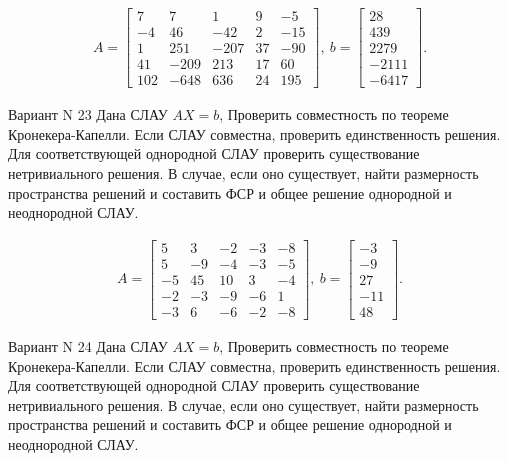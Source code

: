 \documentclass[11pt]{report}
\begin{document}
\begin{align*}
 A = \left[\begin{matrix}7 & 7 & 1 & 9 & -5\\-4 & 46 & -42 & 2 & -15\\1 & 251 & -207 & 37 & -90\\41 & -209 & 213 & 17 & 60\\102 & -648 & 636 & 24 & 195\end{matrix}\right],
\ b = \left[\begin{matrix}28\\439\\2279\\-2111\\-6417\end{matrix}\right]. 
 \end{align*}

Вариант N 23
Дана СЛАУ $AX = b$,
Проверить совместность по теореме Кронекера-Капелли. Если СЛАУ совместна, проверить единственность решения.
Для соответствующей однородной СЛАУ проверить существование нетривиального решения. В случае, если оно существует,
найти размерность пространства решений и составить ФСР и общее решение однородной  и неоднородной СЛАУ.


\begin{align*}
 A = \left[\begin{matrix}5 & 3 & -2 & -3 & -8\\5 & -9 & -4 & -3 & -5\\-5 & 45 & 10 & 3 & -4\\-2 & -3 & -9 & -6 & 1\\-3 & 6 & -6 & -2 & -8\end{matrix}\right],
\ b = \left[\begin{matrix}-3\\-9\\27\\-11\\48\end{matrix}\right]. 
 \end{align*}

Вариант N 24
Дана СЛАУ $AX = b$,
Проверить совместность по теореме Кронекера-Капелли. Если СЛАУ совместна, проверить единственность решения.
Для соответствующей однородной СЛАУ проверить существование нетривиального решения. В случае, если оно существует,
найти размерность пространства решений и составить ФСР и общее решение однородной  и неоднородной СЛАУ.
\end{document}
